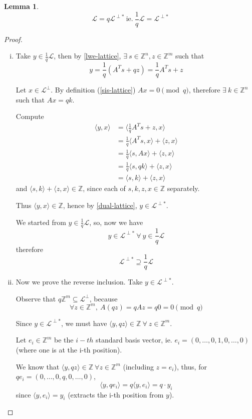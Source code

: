\documentclass{article}
\theoremstyle{definition}
\newtheorem{lemma}[thm]{Lemma}
\newcommand{\Zz}{\mathbb{Z}}
\newcommand{\Ll}{\mathcal{L}}
\begin{document}
\begin{lemma}
    $$\Ll = q \Ll^{\perp *} ~\text{ie.}~ \frac{1}{q} \Ll = \Ll^{\perp *}$$
\end{lemma}
\begin{proof}
    \begin{enumerate}[i.]
    \item
      Take $y \in \frac{1}{q} \Ll$, then by \ref{lwe-lattice}, $\exists~ s \in \Zz^n, z \in \Zz^m$ such that
    $$y = \frac{1}{q} (A^Ts + qz) = \frac{1}{q} A^T s +z$$

    Let $x \in \Ll^\perp$. By definition (\ref{sis-lattice}) $Ax=0 \pmod q$, therefore $\exists~ k \in \Zz^n$ such that $Ax = qk$.

    Compute
    \begin{align*}
	\langle y, x \rangle &= \langle \frac{1}{q} A^T s + z, x \rangle\\
			     &= \frac{1}{q} \langle A^T s, x \rangle + \langle z, x \rangle\\
			     &= \frac{1}{q} \langle s, Ax \rangle + \langle z, x \rangle\\
			     &= \frac{1}{q} \langle s, qk \rangle + \langle z, x \rangle\\
			     &= \langle s, k \rangle + \langle z, x \rangle
    \end{align*}
    and $\langle s, k \rangle + \langle z, x \rangle \in \Zz$, since each of $s, k, z, x \in \Zz$ separately.

    Thus $\langle y, x \rangle \in \Zz$, hence by \ref{dual-lattice}, $y \in \Ll^{\perp *}$.

    We started from $y \in \frac{1}{q}\Ll$, so, now we have
    $$y \in \Ll^{\perp *} ~\forall~ y \in \frac{1}{q} \Ll$$
    therefore
    $$\Ll^{\perp *} \supseteq \frac{1}{q} \Ll$$
    
    \item
    Now we prove the reverse inclusion. Take $y \in \Ll^{\perp *}$.

    Observe that $q \Zz^m \subseteq \Ll^\perp$, because
    $$\forall z \in \Zz^m,~ A(qz) = qAz = q 0 = 0 \pmod q$$

    Since $y \in \Ll^{\perp *}$, we must have $\langle y, qz \rangle \in \Zz ~\forall~ z \in \Zz^m$.

    Let $e_i \in \Zz^m$ be the $i-th$ standard basis vector, ie. $e_i=(0, \ldots, 0, 1, 0, \ldots, 0)$ (where one is at the i-th position).

    We know that $\langle y, qz \rangle \in \Zz ~\forall z \in \Zz^m$ (including $z=e_i$), thus, for
    $q e_i = (0, \ldots, 0, q, 0, \ldots, 0)$,
    $$\langle y, q e_i \rangle = q \langle y, e_i \rangle = q \cdot y_i$$
    since $\langle y, e_i \rangle = y_i$ (extracts the i-th position from $y$).


\end{enumerate}
\end{proof}
\end{document}
